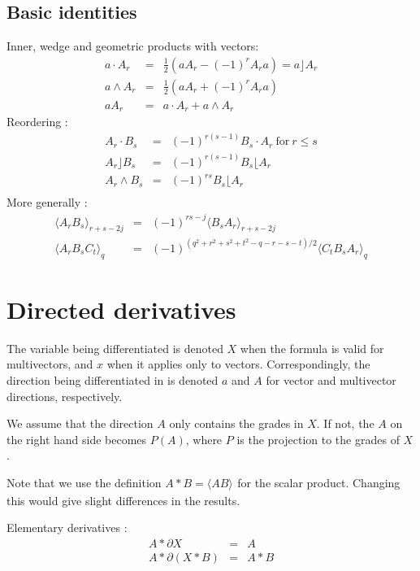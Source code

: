 \documentclass[a4paper,12pt]{article}
\newcommand{\grade}[2]{\ensuremath{\langle#2\rangle_{#1}}}
\newcommand{\linner}{\ensuremath{\rfloor}}
\newcommand{\rinner}{\ensuremath{\lfloor}}
\begin{document}
\subsection{Basic identities}

Inner, wedge and geometric products with vectors\cite{CA2GC}:
\begin{eqnarray}
a\cdot A_r &=& \frac{1}{2}(a A_r - (-1)^r A_r a) = a\linner A_r\\
a\wedge A_r &=& \frac{1}{2}(a A_r + (-1)^r A_r a)\\
a A_r &=& a \cdot A_r + a \wedge A_r
\end{eqnarray}
Reordering \cite{CA2GC, Chisolm:2012aa}:
\begin{eqnarray}
 A_r\cdot B_s &=& (-1)^{r(s-1)} B_s \cdot A_r\ \textrm{for}\ r \leq s\\
 A_r\linner B_s &=& (-1)^{r(s-1)} B_s \rinner A_r\\
 A_r\wedge B_s &=& (-1)^{rs} B_s \rinner A_r\\
\end{eqnarray}
More generally \cite{CA2GC, Chisolm:2012aa}:
\begin{eqnarray}
 \grade{r+s-2j}{A_r B_s} &=& (-1)^{rs - j} \grade{r + s - 2j}{B_s A_r}\\
 \grade{q}{A_r B_s C_t} &=& (-1)^{(q^2 + r^2 + s^2 + t^2 - q - r - s - t)/2} \grade{q}{C_t B_s A_r}
\end{eqnarray}
\section{Directed derivatives}

The variable being differentiated is denoted $X$ when the formula is valid for multivectors, and $x$ when it applies only to vectors. Correspondingly, the direction being differentiated in is denoted $a$ and $A$ for vector and multivector directions, respectively.

We assume that the direction $A$ only contains the grades in $X$. If not, the $A$ on the right hand side becomes $P(A)$, where $P$ is the projection to the grades of $X$.

Note that we use the definition $A * B = \grade{}{A B}$ for the scalar product. Changing this would give slight differences in the results.

Elementary derivatives \cite{HitzerCalculus}:
\begin{eqnarray}
A * \partial  X &=& A\\
A * \partial (X * B)  &=&  A * B
\end{eqnarray}
\end{document}
